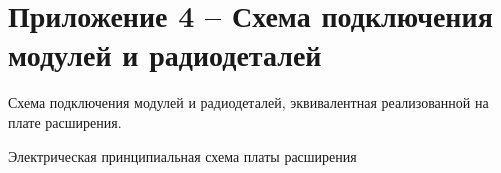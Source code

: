 \section*{Приложение 4 – Схема подключения модулей и радиодеталей}

Схема подключения модулей и радиодеталей, эквивалентная реализованной на плате расширения.


Электрическая принципиальная схема платы расширения

